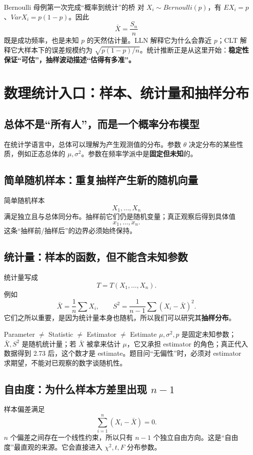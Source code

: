 \documentclass[11pt,a4paper,openany]{ctexbook}
\newcommand{\key}[1]{\textbf{\color{deep}#1}}
\begin{document}
\begin{examplebox}{Bernoulli 母例第一次完成“概率到统计”的桥}
对 $X_i\sim Bernoulli(p)$，有 $EX_i=p$、$VarX_i=p(1-p)$。因此
\[
\bar X=\frac{S_n}{n}
\]
既是成功频率，也是未知 $p$ 的天然估计量。LLN 解释它为什么会靠近 $p$；CLT 解释它大样本下的误差规模约为 $\sqrt{p(1-p)/n}$。统计推断正是从这里开始：\key{稳定性保证“可估”，抽样波动描述“估得有多准”。}
\end{examplebox}

\chapter{数理统计入口：样本、统计量和抽样分布}

\section{总体不是“所有人”，而是一个概率分布模型}
在统计学语言中，总体可以理解为产生观测值的分布。参数 $\theta$ 决定分布的某些性质，例如正态总体的 $\mu,\sigma^2$。参数在频率学派中是\key{固定但未知}的。

\section{简单随机样本：重复抽样产生新的随机向量}
简单随机样本
\[
X_1,\dots,X_n
\]
满足独立且与总体同分布。抽样前它们仍是随机变量；真正观察后得到具体值
\[
x_1,\dots,x_n.
\]
这条“抽样前/抽样后”的边界必须始终保持。

\section{统计量：样本的函数，但不能含未知参数}
统计量写成
\[
T=T(X_1,\dots,X_n).
\]
例如
\[
\bar X=\frac1n\sum X_i,
\qquad
S^2=\frac1{n-1}\sum(X_i-\bar X)^2.
\]
它们之所以重要，是因为统计量本身也随机，所以我们可以研究其\key{抽样分布}。

\begin{boundarybox}{Parameter $\neq$ Statistic $\neq$ Estimator $\neq$ Estimate}
$\mu,\sigma^2,p$ 是固定未知参数；$\bar X,S^2$ 是随机统计量；若 $\bar X$ 被拿来估计 $\mu$，它又承担 estimator 的角色；真正代入数据得到 2.73 后，这个数才是 estimate。题目问“无偏性”时，必须对 estimator 求期望，不能对已观察的数字谈随机性。
\end{boundarybox}

\section{自由度：为什么样本方差里出现 \texorpdfstring{$n-1$}{n-1}}
样本偏差满足
\[
\sum_{i=1}^n(X_i-\bar X)=0.
\]
$n$ 个偏差之间存在一个线性约束，所以只有 $n-1$ 个独立自由方向。这是“自由度”最直观的来源。它会直接进入 $\chi^2,t,F$ 分布参数。
\end{document}
